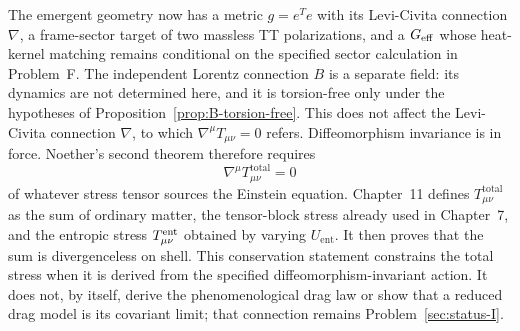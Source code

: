 The emergent geometry now has a metric \(g=e^T e\) with its
Levi-Civita connection \(\nabla\), a frame-sector target of two
massless TT polarizations, and a \(G_{\mathrm{eff}}\) whose heat-kernel matching
remains conditional on the specified sector calculation in
Problem~F. The independent Lorentz connection \(B\) is a separate
field: its dynamics are not determined here, and it is torsion-free
only under the hypotheses of Proposition~\ref{prop:B-torsion-free}.
This does not affect the Levi-Civita connection \(\nabla\), to which
\(\nabla^\mu T_{\mu\nu}=0\) refers.
Diffeomorphism invariance is in force. Noether's second theorem
therefore requires
\begin{equation}
  \label{eq:cons-next}
  \nabla^\mu T_{\mu\nu}^{\mathrm{total}}=0
\end{equation}
of whatever stress tensor sources the Einstein equation. Chapter~11
defines \(T_{\mu\nu}^{\mathrm{total}}\) as the sum of ordinary
matter, the tensor-block stress already used in Chapter~7, and the
entropic stress \(T^{\mathrm{ent}}_{\mu\nu}\) obtained by varying
\(U_{\mathrm{ent}}\). It then proves that the sum is divergenceless
on shell. This conservation statement constrains the total stress
when it is derived from the specified diffeomorphism-invariant
action. It does not, by itself, derive the phenomenological drag law
or show that a reduced drag model is its covariant limit; that
connection remains Problem~\ref{sec:status-I}.